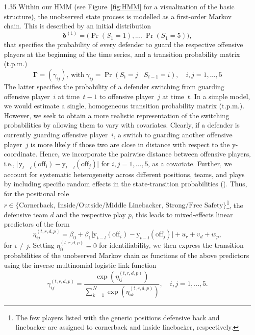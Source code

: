 \documentclass[12pt,a4paper]{article}
\begin{document}
\begin{spacing}{1.35}
Within our HMM (see Figure~\ref{fig:HMM} for a visualization of the basic structure), the unobserved state process is modelled as a first-order Markov chain. This is described by an initial distribution 
$$\boldsymbol{\delta}^{(1)} = \bigl( \Pr(S_1=1), \ldots, \Pr(S_1=5) \bigr),$$ 
that specifies the probability of every defender to guard the respective offensive players at the beginning of the time series, and a transition probability matrix (t.p.m.) 
$$\boldsymbol{\Gamma} = (\gamma_{ij}),\ \text{with} \  \gamma_{ij} = \Pr(S_t = j \mid S_{t-1} = i), \quad i,j = 1, \ldots, 5$$
The latter specifies the probability of a defender switching from guarding offensive player~$i$ at time~$t-1$ to offensive player~$j$ at time~$t$.
In a simple model, we would estimate a single, homogeneous transition probability matrix (t.p.m.). However, we seek to obtain a more realistic representation of the switching probabilities by allowing them to vary with covariates. 
Clearly, if a defender is currently guarding offensive player~$i$, a switch to guarding another offensive player~$j$ is more likely if those two are close in distance with respect to the $\mathrm{y}$-coordinate. Hence, we incorporate the pairwise distance between offensive players, i.e., $\vert \mathrm{y}_{t-l}(\text{off}_i) - \mathrm{y}_{t-l}(\text{off}_j) \vert$ for $i,j = 1, \ldots, 5$, as a covariate.
Further, we account for systematic heterogeneity across different positions, teams, and plays by including specific random effects in the state-transition probabilities (\citealp{maruotti2009semiparametric}). Thus, for the positional role $r \in \{\text{Cornerback, Inside/Outside/Middle Linebacker, Strong/Free Safety}\}$\footnote{The few players listed with the generic positions defensive back and linebacker are assigned to cornerback and inside linebacker, respectively.}, the defensive team $d$ and the respective play $p$, this leads to mixed-effects linear predictors of the form
\begin{equation}\label{eq:re}    
\eta_{ij}^{(t,r,d,p)} = \beta_0 + \beta_1 \vert \mathrm{y}_{t-l}(\text{off}_i) -  \mathrm{y}_{t-l}(\text{off}_j) \vert + u_{r} + v_{d} + w_p,
\end{equation}
for $i \neq j$. Setting $\eta_{ii}^{(t,r,d,p)} \equiv 0$ for identifiability, we then express the transition probabilities of the unobserved Markov chain as functions of the above predictors using the inverse multinomial logistic link function
$$
\gamma_{ij}^{(t,r,d,p)} = \frac{\exp(\eta_{ij}^{(t,r,d,p)})}{\sum_{k=1}^N \exp(\eta_{ik}^{(t,r,d,p)})}, \quad i, j = 1, \dotsc, 5.
$$


\end{spacing}
\end{document}
